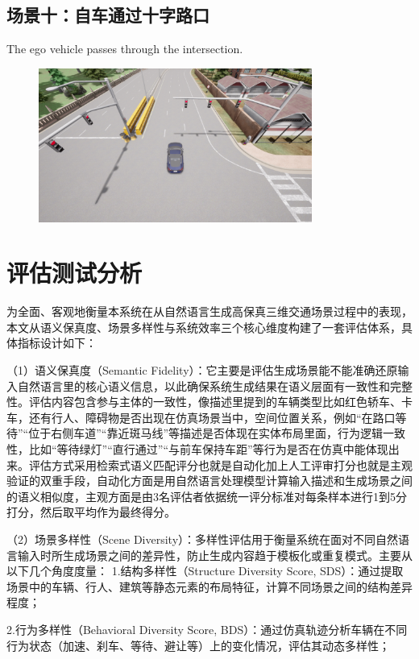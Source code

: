 \subsection {场景十：自车通过十字路口}
\index The ego vehicle passes through the intersection.\\
\begin{figure}[H]
	\centering
	\includegraphics[width=0.8\textwidth]{"images/场景10.png"}
	\caption{}
	\label{}
\end{figure}


\section{评估测试分析}
为全面、客观地衡量本系统在从自然语言生成高保真三维交通场景过程中的表现，本文从语义保真度、场景多样性与系统效率三个核心维度构建了一套评估体系，具体指标设计如下：

（1）语义保真度（Semantic Fidelity）：它主要是评估生成场景能不能准确还原输入自然语言里的核心语义信息，以此确保系统生成结果在语义层面有一致性和完整性。评估内容包含参与主体的一致性，像描述里提到的车辆类型比如红色轿车、卡车，还有行人、障碍物是否出现在仿真场景当中，空间位置关系，例如“在路口等待”“位于右侧车道”“靠近斑马线”等描述是否体现在实体布局里面，行为逻辑一致性，比如“等待绿灯”“直行通过”“与前车保持车距”等行为是否在仿真中能体现出来。评估方式采用检索式语义匹配评分也就是自动化加上人工评审打分也就是主观验证的双重手段，自动化方面是用自然语言处理模型计算输入描述和生成场景之间的语义相似度，主观方面是由3名评估者依据统一评分标准对每条样本进行1到5分打分，然后取平均作为最终得分。

（2）场景多样性（Scene Diversity）：多样性评估用于衡量系统在面对不同自然语言输入时所生成场景之间的差异性，防止生成内容趋于模板化或重复模式。主要从以下几个角度度量：
1.结构多样性（Structure Diversity Score, SDS）：通过提取场景中的车辆、行人、建筑等静态元素的布局特征，计算不同场景之间的结构差异程度；

2.行为多样性（Behavioral Diversity Score, BDS）：通过仿真轨迹分析车辆在不同行为状态（加速、刹车、等待、避让等）上的变化情况，评估其动态多样性；

